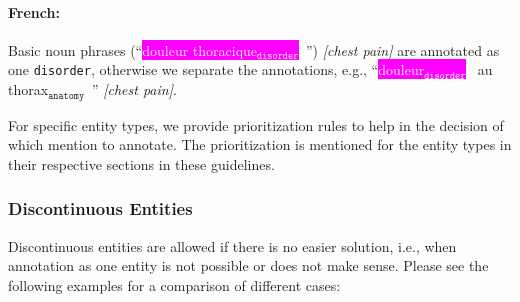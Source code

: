\documentclass[12pt]{article}
\theoremstyle{definition}
\newcommand{\anatomy}[1]{\colorbox{dollarbill}{#1$_{\texttt{anatomy}}$}\ }
\newcommand{\disorder}[1]{\colorbox{fuchsia}{\textcolor{white}{#1$_{\texttt{disorder}}$}}\ }
\newcommand{\dis}{\texttt{disorder}\xspace}
\begin{document}
\paragraph{French:} Basic noun phrases (``\disorder{douleur thoracique}'') \textit{[chest pain]} are annotated as one \dis, otherwise we separate the annotations, e.g., ``\disorder{douleur} au \anatomy{thorax}'' \textit{[chest pain]}.

\medskip

For specific entity types, we provide prioritization rules to help in the decision of which mention to annotate.
The prioritization is mentioned for the entity types in their respective sections in these guidelines. 

\subsubsection*{Discontinuous Entities}

Discontinuous entities are allowed if there is no easier solution, i.e., when annotation as one entity is not possible or does not make sense. 
Please see the following examples for a comparison of different cases:
\end{document}

